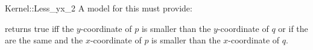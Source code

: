 \begin{ccRefFunctionObjectConcept}{Kernel::Less_yx_2}
A model for this must provide:


{returns true iff the $y$-coordinate of $p$ is smaller than the
$y$-coordinate of $q$ or if the are the same and 
the $x$-coordinate of $p$ is smaller than the $x$-coordinate of $q$.}

\end{ccRefFunctionObjectConcept}

